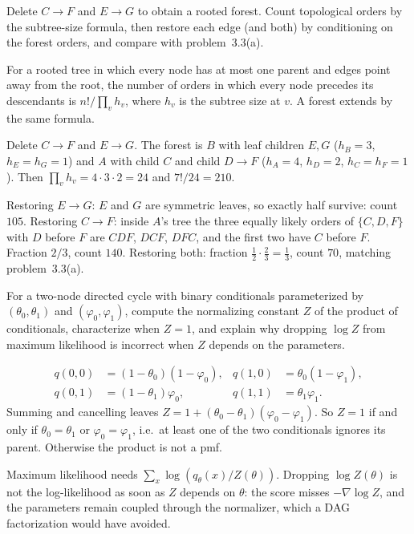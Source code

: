 \begin{hwqbox}
Delete $C\to F$ and $E\to G$ to obtain a rooted forest. Count topological orders by the subtree-size formula, then restore each edge (and both) by conditioning on the forest orders, and compare with problem~3.3(a).
\end{hwqbox}
\begin{hwsolbox}
For a rooted tree in which every node has at most one parent and edges point away from the root, the number of orders in which every node precedes its descendants is $n!/\prod_v h_v$, where $h_v$ is the subtree size at $v$. A forest extends by the same formula.

Delete $C\to F$ and $E\to G$. The forest is $B$ with leaf children $E,G$ ($h_B=3$, $h_E=h_G=1$) and $A$ with child $C$ and child $D\to F$ ($h_A=4$, $h_D=2$, $h_C=h_F=1$). Then $\prod_v h_v=4\cdot 3\cdot 2=24$ and $7!/24=210$.

Restoring $E\to G$: $E$ and $G$ are symmetric leaves, so exactly half survive: count $105$. Restoring $C\to F$: inside $A$'s tree the three equally likely orders of $\{C,D,F\}$ with $D$ before $F$ are $CDF$, $DCF$, $DFC$, and the first two have $C$ before $F$. Fraction $2/3$, count $140$. Restoring both: fraction $\tfrac12\cdot\tfrac23=\tfrac13$, count $70$, matching problem~3.3(a).
\end{hwsolbox}

\begin{hwqbox}
For a two-node directed cycle with binary conditionals parameterized by $(\theta_0,\theta_1)$ and $(\varphi_0,\varphi_1)$, compute the normalizing constant $Z$ of the product of conditionals, characterize when $Z=1$, and explain why dropping $\log Z$ from maximum likelihood is incorrect when $Z$ depends on the parameters.
\end{hwqbox}
\begin{hwsolbox}
\begin{align*}
q(0,0)&=(1-\theta_0)(1-\varphi_0),&
q(1,0)&=\theta_0(1-\varphi_1),\\
q(0,1)&=(1-\theta_1)\varphi_0,&
q(1,1)&=\theta_1\varphi_1.
\end{align*}
Summing and cancelling leaves $Z=1+(\theta_0-\theta_1)(\varphi_0-\varphi_1)$. So $Z=1$ if and only if $\theta_0=\theta_1$ or $\varphi_0=\varphi_1$, i.e.\ at least one of the two conditionals ignores its parent. Otherwise the product is not a pmf.

Maximum likelihood needs $\sum_x\log(q_\theta(x)/Z(\theta))$. Dropping $\log Z(\theta)$ is not the log-likelihood as soon as $Z$ depends on $\theta$: the score misses $-\nabla\log Z$, and the parameters remain coupled through the normalizer, which a DAG factorization would have avoided.
\end{hwsolbox}

